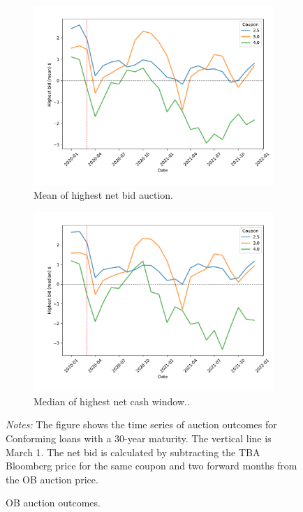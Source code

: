 \documentclass[11pt,a4paper]{article}
\begin{document}
\begin{figure}[h]
\begin{subfigure}[b]{0.49\textwidth}
      \includegraphics[width=0.998\textwidth]{../results/figures/winner_bid_mean_mat30_loan1_timeseries_cpmonthly_2.5_4_cash_window_netbid.pdf}
      \caption{ Mean of highest net bid auction.}
     \end{subfigure}
     \begin{subfigure}[b]{0.49\textwidth}
      \includegraphics[width=0.998\textwidth]{../results/figures/winner_bid_median_mat30_loan1_timeseries_cpmonthly_2.5_4_cash_window_netbid.pdf}
      \caption{ Median of highest net cash window..}
     \end{subfigure}
   \caption{OB auction outcomes. } 
   \begin{minipage}{\textwidth}
      \footnotesize{\textit{Notes:} The figure shows the time series of auction outcomes for Conforming loans with a 30-year maturity.  The vertical line is March 1. The net bid is calculated by subtracting the TBA Bloomberg price for the same coupon and two forward months from the OB auction price. }
      \end{minipage}
\end{figure}
\end{document}
